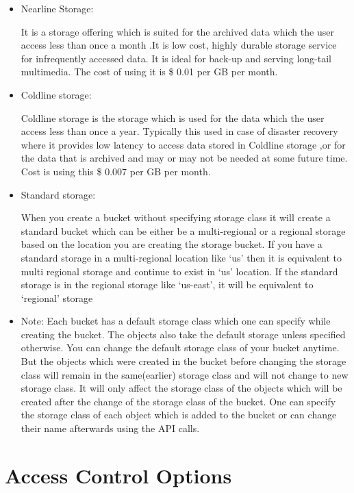 \documentclass[9pt,twocolumn,twoside]{../../styles/osajnl}
\begin{document}
\begin{itemize}
\begin{itemize}
		\end{itemize}

\item Nearline Storage:

It is a storage offering which is suited for the archived data which the user access less than once a month .It is low cost, highly durable storage service for infrequently accessed data. It is ideal for back-up and serving long-tail multimedia. The cost of using it is \$ 0.01 per GB per month. 


\item Coldline storage:

Coldline storage is the storage which is used for the data which the user access less than once a year. Typically this used in case of disaster recovery where it provides low latency to access  data stored in Coldline storage ,or for the data that is archived and may or may not be needed at some future time. Cost is using this \$  0.007 per GB per month.


\item Standard storage: 

When you create a bucket without specifying storage class it will create a standard bucket which can be either be a multi-regional or a regional storage based on the location  you are creating the storage bucket. If you have a standard storage in a multi-regional location like ‘us’ then it is equivalent to multi regional storage and continue to exist in ‘us’ location. If the standard storage is in the regional storage like ‘us-east’, it will be equivalent to ‘regional’ storage 


\item Note:
Each bucket has a default storage class which one can specify while creating the bucket. The objects also take the default storage unless specified otherwise. You can change the default storage class of your bucket anytime. But the objects which were created in the bucket before changing the storage class will remain in the same(earlier) storage class and will not change to new storage class. It will only affect the storage class of the objects which will be created after the change of the storage class of the bucket.
One can specify the storage class of each object which is added to the bucket or can change their name afterwards using the API calls. 

\end{itemize}



\section{Access Control Options}
\end{document}
